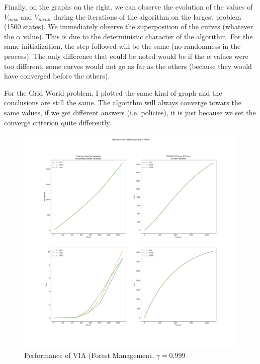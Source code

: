 \documentclass[11pt]{article}
\begin{document}
\begin{multicols}{2}
Finally, on the graphs on the right, we can observe the evolution of the values of $V_{max}$ and $V_{mean}$ during the iterations of the algorithm on the largest problem (1500 states). We immediately observe the superposition of the curves (whatever the $\alpha$ value). This is due to the deterministic character of the algorithm. For the same initialization, the step followed will be the same (no randomness in the process). The only difference that could be noted would be if the $\alpha$ values were too different, some curves would not go as far as the others (because they would have converged before the others).

For the Grid World problem, I plotted the same kind of graph and the conclusions are still the same. The algorithm will always converge towars the same values, if we get different answers (i.e. policies), it is just because we set the converge criterion quite differently.

\begin{figure}[H]
\centering
\includegraphics[width = 0.9\columnwidth]{VI_FM_0.999.png}
\caption{Performance of VIA (Forest Management, $\gamma = 0.999$}
\end{figure}


\end{multicols}
\end{document}
